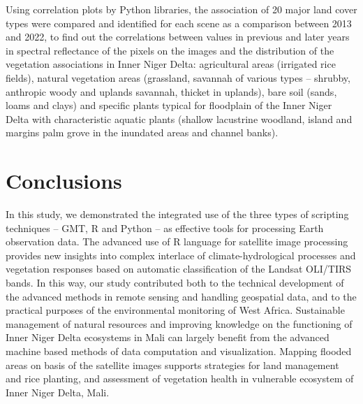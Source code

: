 \documentclass[remotesensing,article,submit,pdftex,moreauthors]{Definitions/mdpi}
\begin{document}
Using correlation plots by Python libraries, the association of 20 major land cover types were compared and identified for each scene as a comparison between 2013 and 2022, to find out the correlations between values in previous and later years in spectral reflectance of the pixels on the images and the distribution of the vegetation associations in Inner Niger Delta: agricultural areas (irrigated rice fields), natural vegetation areas (grassland, savannah of various types -- shrubby, anthropic woody and uplands savannah, thicket in uplands), bare soil (sands, loams and clays) and specific plants typical for floodplain of the Inner Niger Delta with characteristic aquatic plants (shallow lacustrine woodland, island and margins palm grove in the inundated areas and channel banks). 


\section{Conclusions}

In this study, we demonstrated the integrated use of the three types of scripting techniques -- GMT, R and Python -- as effective tools for processing Earth observation data. The advanced use of R language for satellite image processing provides new insights into complex interlace of climate-hydrological processes and vegetation responses based on automatic classification of the Landsat OLI/TIRS bands. In this way, our study contributed both to the technical development of the advanced methods in remote sensing and handling geospatial data, and to the practical purposes of the environmental monitoring of West Africa. Sustainable management of natural resources and improving knowledge on the functioning of Inner Niger Delta ecosystems in Mali can largely benefit from the advanced machine based methods of data computation and visualization. Mapping flooded areas on basis of the satellite images supports strategies for land management and rice planting, and assessment of vegetation health in vulnerable ecosystem of Inner Niger Delta, Mali. 
\end{document}
